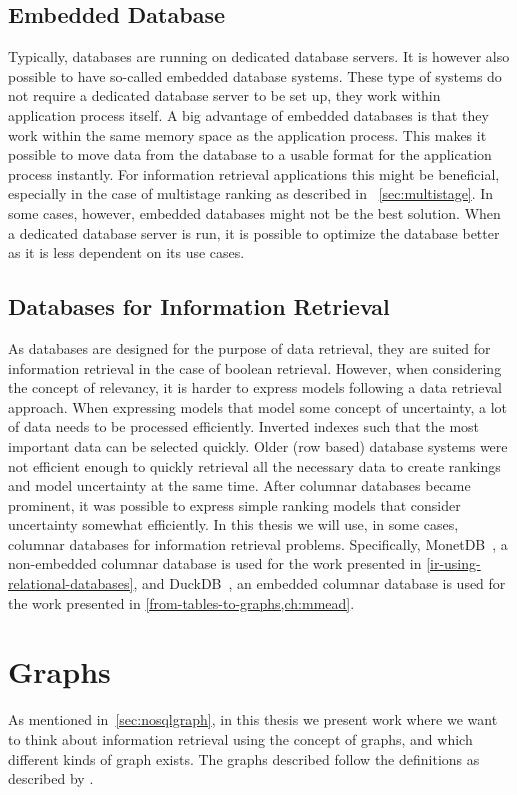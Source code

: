 \subsection{Embedded Database}
Typically, databases are running on dedicated database servers. It is however also possible to have so-called embedded database systems. These type of systems do not require a dedicated database server to be set up, they work within application process itself. A big advantage of embedded databases is that they work within the same memory space as the application process. This makes it possible to move data from the database to a usable format for the application process instantly. For information retrieval applications this might be beneficial, especially in the case of multistage ranking as described in ~\cref{sec:multistage}. In some cases, however, embedded databases might not be the best solution. When a dedicated database server is run, it is possible to optimize the database better as it is less dependent on its use cases. 

\subsection{Databases for Information Retrieval}
As databases are designed for the purpose of data retrieval, they are suited for information retrieval in the case of boolean retrieval. However, when considering the concept of relevancy, it is harder to express models following a data retrieval approach. When expressing models that model some concept of uncertainty, a lot of data needs to be processed efficiently. Inverted indexes such that the most important data can be selected quickly. Older (row based) database systems were not efficient enough to quickly retrieval all the necessary data to create rankings and model uncertainty at the same time. After columnar databases became prominent, it was possible to express simple ranking models that consider uncertainty somewhat efficiently. In this thesis we will use, in some cases, columnar databases for information retrieval problems. Specifically, MonetDB~\cite{monet}, a non-embedded columnar database is used for the work presented in \cref{ir-using-relational-databases}, and DuckDB~\cite{duckdb}, an embedded columnar database is used for the work presented in \cref{from-tables-to-graphs,ch:mmead}.

\section{Graphs}
\label{sec:graphs}
As mentioned in~\cref{sec:nosqlgraph}, in this thesis we present work where we want to think about information retrieval using the concept of graphs, and which different kinds of graph exists. The graphs described follow the definitions as described by \citet{big-graphs}.

